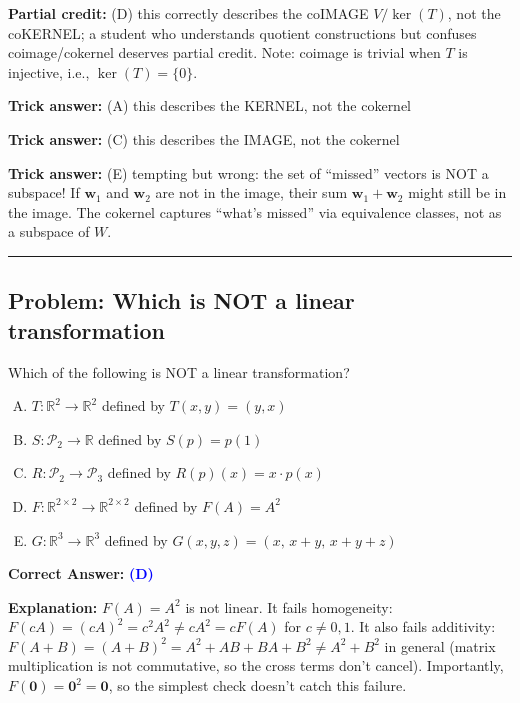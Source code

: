 \documentclass[12pt]{amsart}
\newcommand{\divider}{
  \vspace{-1em}
  \noindent
  \raisebox{-0.15ex}{\textbullet}%
  \hspace{0.5em}%
  \rule[0.5ex]{0.95\textwidth}{1.0pt}%
  \hspace{0.5em}%
  \raisebox{-0.15ex}{\textbullet}%
  \vspace{0em}
}
\begin{document}
\textbf{Partial credit:} (D) this correctly describes the coIMAGE $V/\ker(T)$, not the coKERNEL; a student who understands quotient constructions but confuses coimage/cokernel deserves partial credit. Note: coimage is trivial when $T$ is injective, i.e., $\ker(T) = \{0\}$.

\textbf{Trick answer:} (A) this describes the KERNEL, not the cokernel

\textbf{Trick answer:} (C) this describes the IMAGE, not the cokernel

\textbf{Trick answer:} (E) tempting but wrong: the set of ``missed'' vectors is NOT a subspace! If $\mathbf{w}_1$ and $\mathbf{w}_2$ are not in the image, their sum $\mathbf{w}_1 + \mathbf{w}_2$ might still be in the image. The cokernel captures ``what's missed'' via equivalence classes, not as a subspace of $W$.

\divider

\subsection*{Problem: Which is NOT a linear transformation}

Which of the following is NOT a linear transformation?

\begin{enumerate}[(A)]
\item $T: \mathbb{R}^2 \to \mathbb{R}^2$ defined by $T(x,y) = (y, x)$
\item $S: \mathcal{P}_2 \to \mathbb{R}$ defined by $S(p) = p(1)$
\item $R: \mathcal{P}_2 \to \mathcal{P}_3$ defined by $R(p)(x) = x \cdot p(x)$
\item $F: \mathbb{R}^{2 \times 2} \to \mathbb{R}^{2 \times 2}$ defined by $F(A) = A^2$
\item $G: \mathbb{R}^3 \to \mathbb{R}^3$ defined by $G(x,y,z) = (x,\, x+y,\, x+y+z)$
\end{enumerate}

\textbf{Correct Answer:} \textcolor{blue}{\textbf{(D)}}

\textbf{Explanation:} $F(A) = A^2$ is not linear. It fails homogeneity: $F(cA) = (cA)^2 = c^2 A^2 \neq c A^2 = cF(A)$ for $c \neq 0, 1$. It also fails additivity: $F(A+B) = (A+B)^2 = A^2 + AB + BA + B^2 \neq A^2 + B^2$ in general (matrix multiplication is not commutative, so the cross terms don't cancel). Importantly, $F(\mathbf{0}) = \mathbf{0}^2 = \mathbf{0}$, so the simplest check doesn't catch this failure.
\end{document}
